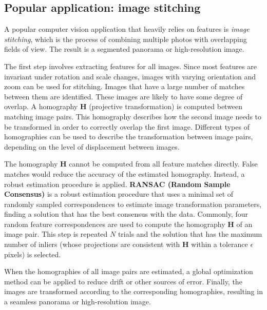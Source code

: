 \subsection{Popular application: image stitching}
A popular computer vision application that heavily relies on features is \textit{image stitching}, which is the process of combining multiple photos with overlapping fields of view.
The result is a segmented panorama or high-resolution image. 

The first step involves extracting features for all images.
Since most features are invariant under rotation and scale changes, images with varying orientation and zoom can be used for stitching.
Images that have a large number of matches between them are identified.
These images are likely to have some degree of overlap.
A homography $\boldsymbol{H}$ (projective transformation) is computed between matching image pairs.
This homography describes how the second image needs to be transformed in order to correctly overlap the first image.
Different types of homographies can be used to describe the transformation between image pairs, depending on the level of displacement between images.

The homography $\boldsymbol{H}$ cannot be computed from all feature matches directly.
False matches would reduce the accuracy of the estimated homography.
Instead, a robust estimation procedure is applied.
\textbf{RANSAC (Random Sample Consensus)} \cite{fischler1981random} is a robust estimation procedure that uses a minimal set of randomly sampled correspondences to estimate image transformation parameters, finding a solution that has the best consensus with the data.
Commonly, four random feature correspondences are used to compute the homography $\boldsymbol{H}$ of an image pair.
This step is repeated $N$ trials and the solution that has the maximum number of inliers (whose projections are consistent with $\boldsymbol{H}$ within a tolerance $\epsilon$ pixels) is selected.

When the homographies of all image pairs are estimated, a global optimization method can be applied to reduce drift or other sources of error.
Finally, the images are transformed according to the corresponding homographies, resulting in a seamless panorama or high-resolution image. 


